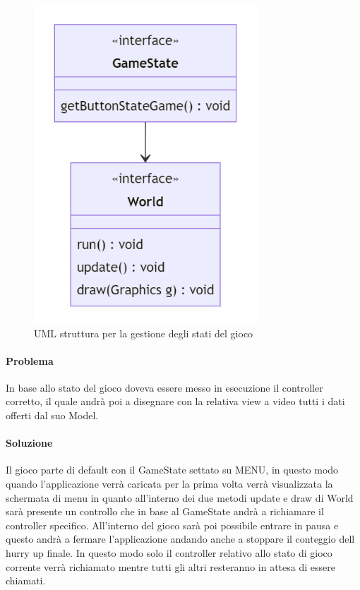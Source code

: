 \documentclass[a4paper,12pt]{report}
\begin{document}
\begin{figure}[H]
    \centering{}
    \includegraphics[width=0.75\textwidth]{img/UMLGestioneGameState.png}
    \caption{UML struttura per la gestione degli stati del gioco}
\end{figure}

\paragraph{Problema} In base allo stato del gioco doveva essere messo in esecuzione il controller corretto, il quale andrà poi a disegnare con la relativa view a video tutti i dati offerti dal suo Model.

\paragraph{Soluzione} Il gioco parte di default con il GameState settato su MENU, in questo modo quando l’applicazione verrà caricata per la prima volta verrà visualizzata la schermata di menu in quanto all’interno dei due metodi update e draw di World sarà presente un controllo che in base al GameState andrà a richiamare il controller specifico. All'interno del gioco sarà poi possibile entrare in  pausa e questo andrà a fermare l’applicazione andando anche a stoppare il conteggio dell hurry up finale. In questo modo solo il controller relativo allo stato di gioco corrente verrà richiamato mentre tutti gli altri resteranno in attesa di essere chiamati.
\end{document}
